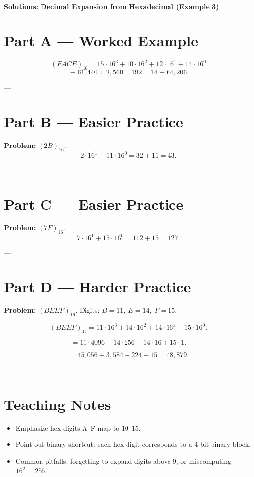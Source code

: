 \documentclass[12pt]{article}
\begin{document}
\begin{center}
\Large\textbf{Solutions: Decimal Expansion from Hexadecimal (Example 3)}
\end{center}

\section*{Part A — Worked Example}
\[
(FACE)_{16} = 15\cdot 16^3 + 10\cdot 16^2 + 12\cdot 16^1 + 14\cdot 16^0
\]
\[
= 61{,}440 + 2{,}560 + 192 + 14 = \boxed{64{,}206}.
\]

---

\section*{Part B — Easier Practice}
\textbf{Problem:} $(2B)_{16}$.  
\[
2\cdot 16^1 + 11\cdot 16^0 = 32 + 11 = \boxed{43}.
\]

---

\section*{Part C — Easier Practice}
\textbf{Problem:} $(7F)_{16}$.  
\[
7\cdot 16^1 + 15\cdot 16^0 = 112 + 15 = \boxed{127}.
\]

---

\section*{Part D — Harder Practice}
\textbf{Problem:} $(BEEF)_{16}$.  
Digits: $B=11,\; E=14,\; F=15$.

\[
(BEEF)_{16} = 11\cdot 16^3 + 14\cdot 16^2 + 14\cdot 16^1 + 15\cdot 16^0.
\]

\[
= 11\cdot 4096 + 14\cdot 256 + 14\cdot 16 + 15\cdot 1.
\]

\[
= 45{,}056 + 3{,}584 + 224 + 15 = \boxed{48{,}879}.
\]

---

\section*{Teaching Notes}
\begin{itemize}
  \item Emphasize hex digits A–F map to 10–15.
  \item Point out binary shortcut: each hex digit corresponds to a 4-bit binary block.
  \item Common pitfalls: forgetting to expand digits above 9, or miscomputing $16^2=256$.
\end{itemize}
\end{document}
